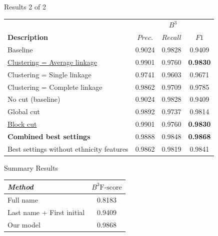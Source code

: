 \documentclass{beamer}
\begin{document}


\begin{frame}{Results 2 of 2}

\begin{table}
\centering
\begin{tabular}{|l|c c c |}
  \hline
                       & \multicolumn{3}{|c|}{\textbf{$B^{3}$}}\\
  \textbf{Description} & $Prec.$ & $Recall$ & $F1$ \\
  \hline
  \hline
Baseline & 0.9024 & 0.9828 & 0.9409  \\
\hline
\underline{Clustering = Average linkage} & 0.9901 & 0.9760 & \textbf{0.9830}  \\
Clustering = Single linkage & 0.9741 & 0.9603 & 0.9671  \\
Clustering = Complete linkage & 0.9862 & 0.9709 & 0.9785   \\
\hline
No cut (baseline) & 0.9024 & 0.9828 & 0.9409   \\
Global cut & 0.9892 & 0.9737 & 0.9814   \\
\underline{Block cut} & 0.9901 & 0.9760 & \textbf{0.9830} \\
\hline
\textbf{Combined best settings} & 0.9888 & 0.9848 & \textbf{0.9868}  \\
Best settings without ethnicity features & 0.9862 & 0.9819 & 0.9841 \\
\hline

\end{tabular}
\end{table}

\end{frame}


\begin{frame}{Summary Results}

\begin{table}
    \centering
    \begin{tabular}{| l c |}
    \hline
        \textit{Method} & \textit{$B^3 \text{F-score}$}  \\
    \hline
    \hline
    Full name & 0.8183 \\
    Last name + First initial & 0.9409 \\
    \hline
    Our model & {\color{blue} 0.9868} \\
    \hline
    \end{tabular}
\end{table}

\end{frame}
\end{document}
